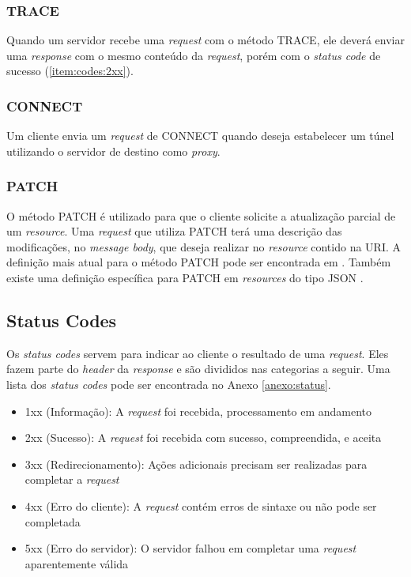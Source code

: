
\subsubsection{TRACE}
Quando um servidor recebe uma \textit{request} com o método TRACE, ele deverá enviar uma \textit{response} com o mesmo conteúdo da \textit{request}, porém com o \textit{status code} de sucesso (\ref{item:codes:2xx}).

\subsubsection{CONNECT}
Um cliente envia um \textit{request} de CONNECT quando deseja estabelecer um túnel utilizando o servidor de destino como \textit{proxy}.

\subsubsection{PATCH}
O método PATCH é utilizado para que o cliente solicite a atualização parcial de um \textit{resource}. Uma \textit{request} que utiliza PATCH terá uma descrição das modificações, no \textit{message body}, que deseja realizar no \textit{resource} contido na URI. A definição mais atual para o método PATCH pode ser encontrada em \cite{RFC5789}. Também existe uma definição específica para PATCH em \textit{resources} do tipo JSON \cite{RFC7396}.

\subsection{Status Codes}
\label{sec:http:status}

Os \textit{status codes} servem para indicar ao cliente o resultado de uma \textit{request}. Eles fazem parte do \textit{header} da \textit{response} e são divididos nas categorias a seguir. Uma lista dos \textit{status codes} \cite{RFC7231} pode ser encontrada no Anexo \ref{anexo:status}.

\begin{itemize}
    \item 1xx (Informação): A \textit{request} foi recebida, processamento em andamento
    \item 2xx \label{item:codes:2xx}(Sucesso): A \textit{request} foi recebida com sucesso, compreendida, e aceita
    \item 3xx (Redirecionamento): Ações adicionais precisam ser realizadas para completar a \textit{request}
    \item 4xx (Erro do cliente): A \textit{request} contém erros de sintaxe ou não pode ser completada
    \item 5xx (Erro do servidor): O servidor falhou em completar uma \textit{request} aparentemente válida
\end{itemize}
